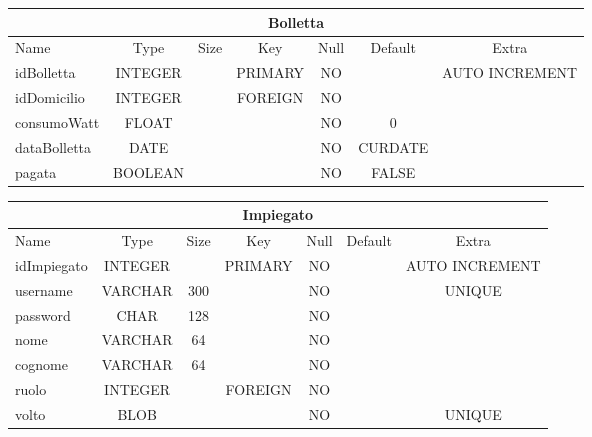\begin{center}
    \begin{tabular}{ |l|c|c|c|c|c|c| } 
        \hline
        \multicolumn{7}{|c|}{Bolletta} \\
        \hline
            Name             & Type     & Size  & Key       & Null  & Default   & Extra \\
        \hline
            idBolletta       & INTEGER  &       & PRIMARY   & NO    &           & AUTO INCREMENT \\
            idDomicilio      & INTEGER  &       & FOREIGN   & NO    &           & \\
            consumoWatt      & FLOAT    &       &           & NO    & 0         & \\
            dataBolletta     & DATE     &       &           & NO    & CURDATE   & \\
            pagata           & BOOLEAN  &       &           & NO    & FALSE     & \\
        \hline
    \end{tabular}
\end{center}
\begin{center}
    \begin{tabular}{ |l|c|c|c|c|c|c| } 
        \hline
        \multicolumn{7}{|c|}{Impiegato} \\
        \hline
            Name             & Type     & Size  & Key       & Null  & Default   & Extra \\
        \hline
            idImpiegato      & INTEGER  &       & PRIMARY   & NO    &           & AUTO INCREMENT \\
            username         & VARCHAR  & 300   &           & NO    &           & UNIQUE \\
            password         & CHAR     & 128   &           & NO    &           & \\
            nome             & VARCHAR  & 64    &           & NO    &           & \\
            cognome          & VARCHAR  & 64    &           & NO    &           & \\
            ruolo            & INTEGER  &       & FOREIGN   & NO    &           & \\
            volto            & BLOB     &       &           & NO    &           & UNIQUE \\
        \hline
    \end{tabular}
\end{center}

